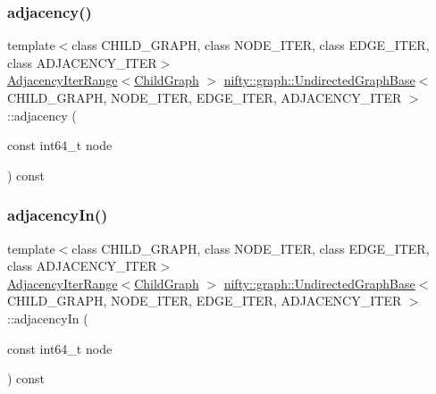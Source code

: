\subsubsection{\texorpdfstring{adjacency()}{adjacency()}}
{\footnotesize\ttfamily template$<$class C\+H\+I\+L\+D\+\_\+\+G\+R\+A\+PH, class N\+O\+D\+E\+\_\+\+I\+T\+ER, class E\+D\+G\+E\+\_\+\+I\+T\+ER, class A\+D\+J\+A\+C\+E\+N\+C\+Y\+\_\+\+I\+T\+ER$>$ \\
\hyperlink{structnifty_1_1graph_1_1UndirectedGraphBase_1_1AdjacencyIterRange}{Adjacency\+Iter\+Range}$<$\hyperlink{classnifty_1_1graph_1_1UndirectedGraphBase_af2541cf9fb91440ff0a7b56dd5a6be29}{Child\+Graph} $>$ \hyperlink{classnifty_1_1graph_1_1UndirectedGraphBase}{nifty\+::graph\+::\+Undirected\+Graph\+Base}$<$ C\+H\+I\+L\+D\+\_\+\+G\+R\+A\+PH, N\+O\+D\+E\+\_\+\+I\+T\+ER, E\+D\+G\+E\+\_\+\+I\+T\+ER, A\+D\+J\+A\+C\+E\+N\+C\+Y\+\_\+\+I\+T\+ER $>$\+::adjacency (\begin{DoxyParamCaption}\item[{const int64\+\_\+t}]{node }\end{DoxyParamCaption}) const\hspace{0.3cm}{\ttfamily [inline]}}

\mbox{\label{classnifty_1_1graph_1_1UndirectedGraphBase_a40d901c4ac73481fe54e829749b4b079}} 
\subsubsection{\texorpdfstring{adjacency\+In()}{adjacencyIn()}}
{\footnotesize\ttfamily template$<$class C\+H\+I\+L\+D\+\_\+\+G\+R\+A\+PH, class N\+O\+D\+E\+\_\+\+I\+T\+ER, class E\+D\+G\+E\+\_\+\+I\+T\+ER, class A\+D\+J\+A\+C\+E\+N\+C\+Y\+\_\+\+I\+T\+ER$>$ \\
\hyperlink{structnifty_1_1graph_1_1UndirectedGraphBase_1_1AdjacencyIterRange}{Adjacency\+Iter\+Range}$<$\hyperlink{classnifty_1_1graph_1_1UndirectedGraphBase_af2541cf9fb91440ff0a7b56dd5a6be29}{Child\+Graph} $>$ \hyperlink{classnifty_1_1graph_1_1UndirectedGraphBase}{nifty\+::graph\+::\+Undirected\+Graph\+Base}$<$ C\+H\+I\+L\+D\+\_\+\+G\+R\+A\+PH, N\+O\+D\+E\+\_\+\+I\+T\+ER, E\+D\+G\+E\+\_\+\+I\+T\+ER, A\+D\+J\+A\+C\+E\+N\+C\+Y\+\_\+\+I\+T\+ER $>$\+::adjacency\+In (\begin{DoxyParamCaption}\item[{const int64\+\_\+t}]{node }\end{DoxyParamCaption}) const\hspace{0.3cm}{\ttfamily [inline]}}

